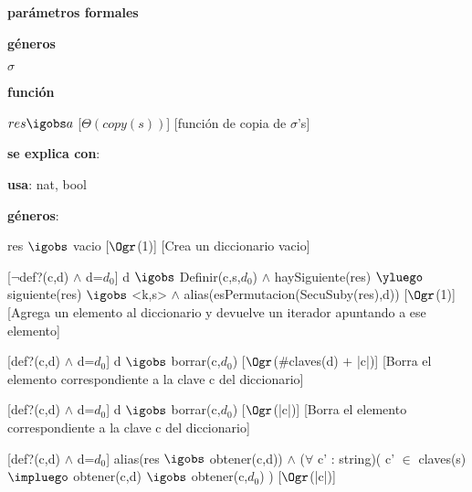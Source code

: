 \begin{Interfaz}

	\textbf{parámetros formales}\parindent\\
	\parbox{1.7cm}{\textbf{géneros}} $\sigma$\\
	\parbox[t]{1.7cm}{\textbf{función}}\parbox[t]{\textwidth-2\parindent-1.7cm}{%
	    	{$res \igobs a$}
		[$\Theta(copy(s))$]
		[función de copia de $\sigma$'s]
	}
	
	\textbf{se explica con}: 
	
	\textbf{usa}: nat, bool
	
	\textbf{géneros}: 
	
	
	{res $\igobs$ vacio}
	[$\Ogr$(1)]
	[Crea un diccionario vacio]
	
	[$\neg$def?(c,d) $\land$ d=$d_0$]
	{d $\igobs$ Definir(c,s,$d_0$) $\land$ haySiguiente(res) $\yluego$ siguiente(res) $\igobs$ <k,s> $\land$ alias(esPermutacion(SecuSuby(res),d))}
	[$\Ogr$(1)]
	[Agrega un elemento al diccionario y devuelve un iterador apuntando a ese elemento]	
	
	[def?(c,d) $\land$ d=$d_0$]
	{d $\igobs$ borrar(c,$d_0$)}
	[$\Ogr$($\#$claves(d) $+$ |c|)]
	[Borra el elemento correspondiente a la clave c del diccionario]
	
	[def?(c,d) $\land$ d=$d_0$]
	{d $\igobs$ borrar(c,$d_0$)}
	[$\Ogr$(|c|)]
	[Borra el elemento correspondiente a la clave c del diccionario]
	
	[def?(c,d) $\land$ d=$d_0$]
	{alias(res $\igobs$ obtener(c,d)) $\land$ ($\forall$ c' : string)( c' $\in$ claves(s) $\impluego$ obtener(c,d) $\igobs$ obtener(c,$d_0$) )}
	[$\Ogr$(|c|)]
	
\end{Interfaz}